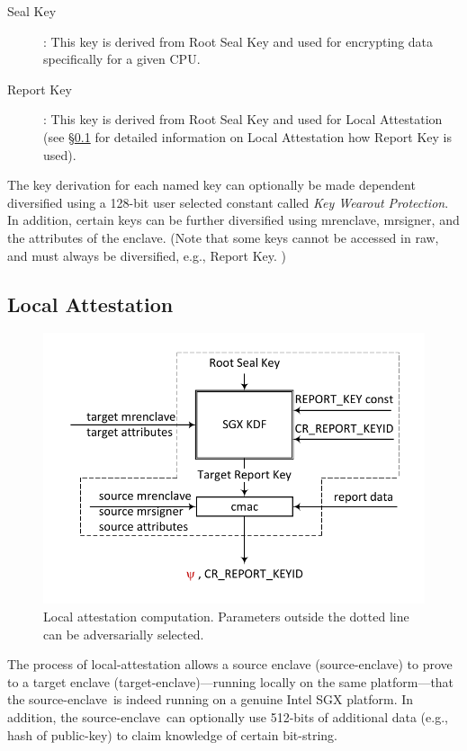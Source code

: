\documentclass[10pt]{article}
\newcommand{\secref}[1]{\S\ref{#1}}
\newcommand{\mrenclave}{\textsf{mrenclave}}
\newcommand{\mrsigner}{\textsf{mrsigner}}
\newcommand{\se}{source-enclave}
\newcommand{\te}{target-enclave}
\begin{document}
\begin{description}
  \item[Seal Key]: This key is derived from Root Seal Key and used for
    encrypting data specifically for a given CPU.

  \item[Report Key]: This key is derived from Root Seal Key and used
    for Local Attestation (see \secref{ssec:localatt} for detailed
    information on Local Attestation how Report Key is used).
  \end{description}

  The key derivation for each named key can optionally be made
  dependent diversified using a 128-bit user selected constant called
  \textit{Key Wearout Protection}. In addition, certain keys can be
  further diversified using \mrenclave, \mrsigner, and the attributes
  of the enclave. (Note that some keys cannot be accessed in raw, and
  must always be diversified, e.g., Report Key. )


  \subsection{Local Attestation}
  \label{ssec:localatt}

  \begin{figure}
  \centering
  \includegraphics[width=0.5\linewidth]{Diagrams/LocalAttestation}
  \caption{Local attestation computation.
  Parameters outside the dotted line can be adversarially selected.}
  \label{fig:localattestation}
  \end{figure}

  The process of local-attestation allows a source enclave (\se) to
  prove to a target enclave (\te)---running locally on the same
  platform---that the \se\ is indeed running on a genuine Intel SGX
  platform. In addition, the \se\ can optionally use 512-bits of
  additional data (e.g., hash of public-key) to claim knowledge of
  certain bit-string.
\end{document}
